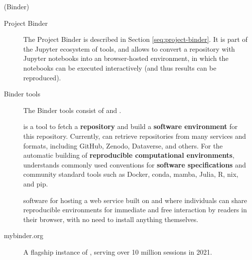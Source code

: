 \begin{terminology}{(Binder)}
\begin{description}
\item[Project Binder] The Project Binder is described in Section
\ref{seq:project-binder}. It is part of the Jupyter ecosystem of tools, and
allows to convert a repository with Jupyter notebooks into an browser-hosted
environment, in which the notebooks can be executed interactively (and thus
results can be reproduced).

\item[Binder tools] The Binder tools consist of \binderhub{} and \repotodocker{}.

\item[\repotodocker] \repotodocker{} is a tool to fetch a \textbf{repository} and build a \textbf{software
environment} for this repository. Currently, \repotodocker{} can retrieve
repositories from many services and formats, including GitHub, Zenodo, Dataverse, and others.
For the automatic building of \textbf{reproducible computational environments},
\repotodocker{} understands commonly used conventions for \textbf{software specifications} and
community standard tools such as Docker, conda, mamba, Julia, R, nix, and pip.

\item[\BinderHub] software for hosting a web service built on \repotodocker and \JupyterHub where individuals can share reproducible environments for
immediate and free interaction by readers in their browser,
  with no need to install anything themselves.
\item[mybinder.org] A flagship instance of \BinderHub,
  serving over 10 million sessions in 2021.
\end{description}
\end{terminology}






